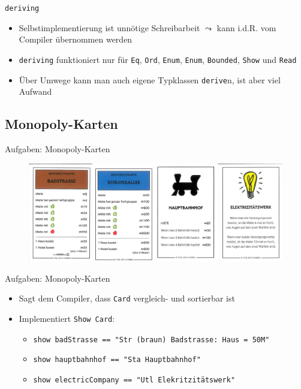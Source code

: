 \documentclass{beamer}
\newcommand{\code}[1]{
	\begin{mdframed}
		
	\end{mdframed}
}
\begin{document}
\begin{frame}{\texttt{deriving}}
	\code{demos/PlayingCards2.hs}

	\begin{itemize}
		\item Selbstimplementierung ist unnötige Schreibarbeit $\leadsto$ kann i.d.R. vom Compiler übernommen werden
		\item \texttt{deriving} funktioniert nur für \texttt{Eq}, \texttt{Ord}, \texttt{Enum}, \texttt{Enum}, \texttt{Bounded}, \texttt{Show} und \texttt{Read}
		\item Über Umwege kann man auch eigene Typklassen \texttt{derive}n, ist aber viel Aufwand
	\end{itemize}
\end{frame}

\subsection{Monopoly-Karten}

\begin{frame}{Aufgaben: Monopoly-Karten}
	\begin{figure}
		\includegraphics[width=\textwidth]{images/monopoly-cards}
	\end{figure}

	\code{demos/MonopolyCards.hs}
\end{frame}

\begin{frame}{Aufgaben: Monopoly-Karten}
	\code{demos/MonopolyCards.hs}

	\begin{itemize}
		\item Sagt dem Compiler, dass \texttt{Card} vergleich- und sortierbar ist
		\item Implementiert \texttt{Show Card}:
		\begin{itemize}
			\item \texttt{show badStrasse == "{}Str (braun) Badstrasse: Haus = 50M"{}}
			\item \texttt{show hauptbahnhof == "{}Sta Hauptbahnhof"{}}
			\item \texttt{show electricCompany == "{}Utl Elekritzitätswerk"{}}
		\end{itemize}
	\end{itemize}
\end{frame}
\end{document}
